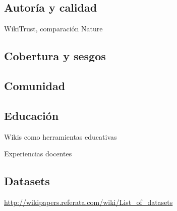 \documentclass[11pt,onecolumn]{article}
\begin{document}
\subsection{Autoría y calidad}

WikiTrust, comparación Nature


\subsection{Cobertura y sesgos}


\subsection{Comunidad}


\subsection{Educación}


Wikis como herramientas educativas

Experiencias docentes

\subsection{Datasets}

\href{http://wikipapers.referata.com/wiki/List_of_datasets}{http://wikipapers.referata.com/wiki/List\_of\_datasets}
\end{document}
